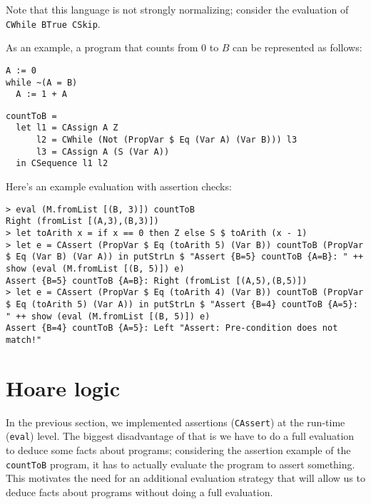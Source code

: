 \documentclass{article}
\begin{document}
Note that this language is not strongly normalizing; consider the evaluation of \texttt{CWhile BTrue CSkip}.

As an example, a program that counts from 0 to $B$ can be represented as follows:

\begin{minipage}{0.29\textwidth}
\begin{lstlisting}
A := 0
while ~(A = B)
  A := 1 + A
\end{lstlisting}
\end{minipage}
\begin{minipage}{0.69\textwidth}
\begin{lstlisting}
countToB =
  let l1 = CAssign A Z
      l2 = CWhile (Not (PropVar $ Eq (Var A) (Var B))) l3
      l3 = CAssign A (S (Var A))
  in CSequence l1 l2
\end{lstlisting}
\end{minipage}

Here's an example evaluation with assertion checks:

\begin{lstlisting}
> eval (M.fromList [(B, 3)]) countToB
Right (fromList [(A,3),(B,3)])
> let toArith x = if x == 0 then Z else S $ toArith (x - 1)
> let e = CAssert (PropVar $ Eq (toArith 5) (Var B)) countToB (PropVar $ Eq (Var B) (Var A)) in putStrLn $ "Assert {B=5} countToB {A=B}: " ++ show (eval (M.fromList [(B, 5)]) e)
Assert {B=5} countToB {A=B}: Right (fromList [(A,5),(B,5)])
> let e = CAssert (PropVar $ Eq (toArith 4) (Var B)) countToB (PropVar $ Eq (toArith 5) (Var A)) in putStrLn $ "Assert {B=4} countToB {A=5}: " ++ show (eval (M.fromList [(B, 5)]) e)
Assert {B=4} countToB {A=5}: Left "Assert: Pre-condition does not match!"
\end{lstlisting}

\section{Hoare logic}

In the previous section, we implemented assertions (\texttt{CAssert}) at the run-time (\texttt{eval}) level. The biggest disadvantage of that is we have to do a full evaluation to deduce some facts about programs; considering the assertion example of the \texttt{countToB} program, it has to actually evaluate the program to assert something. This motivates the need for an additional evaluation strategy that will allow us to deduce facts about programs without doing a full evaluation.
\end{document}
